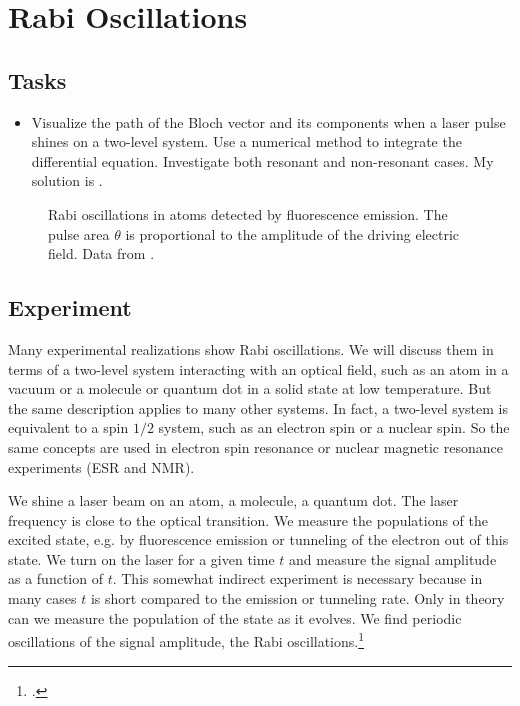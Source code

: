 \renewcommand{\lastmod}{May 24, 2024}
\renewcommand{\chapterauthors}{Markus Lippitz}


\chapter{Rabi Oscillations}



\section{Tasks}

\begin{itemize}
\item  Visualize the  path of the Bloch vector and its components when a laser pulse shines on a two-level system. Use a numerical method to integrate the differential equation. Investigate both resonant and non-resonant cases.  My solution is .
\end{itemize}


\begin{figure}[h!]
  \caption{Rabi oscillations in  atoms detected by fluorescence emission. The pulse area $\theta$ is proportional to the amplitude of the driving electric field. Data from \cite{Gibbs1973}.}
\end{figure}

\section{Experiment}

Many experimental realizations show Rabi oscillations. We will discuss them in terms of a two-level system interacting with an optical field, such as an atom in a vacuum or a molecule or quantum dot in a solid state at low temperature. But the same description applies to many other systems. In fact, a two-level system is equivalent to a spin $1/2$ system, such as an electron spin or a nuclear spin. So the same concepts are used in electron spin resonance or nuclear magnetic resonance experiments (ESR and NMR).

We shine a laser beam on an atom, a molecule, a quantum dot. The laser frequency is close to the optical transition. We measure the populations of the excited state, e.g. by fluorescence emission or tunneling of the electron out of this state. We turn on the laser for a given time $t$ and measure the signal amplitude as a function of $t$. This somewhat indirect experiment is necessary because in many cases $t$ is short compared to the emission or tunneling rate. Only in theory can we measure the population of the state as it evolves. We find periodic oscillations of the signal amplitude, the Rabi oscillations.\footcite{Rabi1939}


